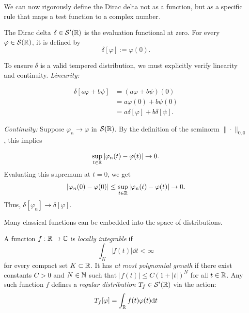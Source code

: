 We can now rigorously define the Dirac delta not as a function, but as a specific rule that maps a test function to a complex number.

\begin{definition}
The Dirac delta $\delta \in \mathcal{S}'(\mathbb{R})$ is the evaluation functional at zero. For every $\varphi \in \mathcal{S}(\mathbb{R})$, it is defined by
\begin{equation}
\delta[\varphi] := \varphi(0).
\end{equation}

\end{definition}

\begin{remark}
To ensure $\delta$ is a valid tempered distribution, we must explicitly verify linearity and continuity.
\textit{Linearity:}

\[
\begin{aligned}
\delta[a\varphi + b\psi] &= (a\varphi + b\psi)(0) \\
&= a\varphi(0) + b\psi(0) \\
&= a\delta[\varphi] + b\delta[\psi].
\end{aligned}
\]

\textit{Continuity:} Suppose $\varphi_n \to \varphi$ in $\mathcal{S}(\mathbb{R})$. By the definition of the seminorm $\|\cdot\|_{0,0}$, this implies

\[
\sup_{t \in \mathbb{R}} |\varphi_n(t) - \varphi(t)| \to 0.
\]
Evaluating this supremum at $t=0$, we get
\[
|\varphi_n(0) - \varphi(0)| \leq \sup_{t \in \mathbb{R}} |\varphi_n(t) - \varphi(t)| \to 0.
\]
Thus, $\delta[\varphi_n] \to \delta[\varphi]$.
\end{remark}

Many classical functions can be embedded into the space of distributions.

\begin{definition}
A function $f: \mathbb{R} \to \mathbb{C}$ is \textit{locally integrable} if \[
\int_K |f(t)| \dd t < \infty
\] for every compact set $K \subset \mathbb{R}$. It has \textit{at most polynomial growth} if there exist constants $C > 0$ and $N \in \mathbb{N}$ such that $|f(t)| \leq C(1 + |t|)^N$ for all $t \in \mathbb{R}$.
Any such function $f$ defines a \textit{regular distribution} $T_f \in \mathcal{S}'(\mathbb{R})$ via the action:
\begin{equation}
T_f[\varphi] = \int_{\mathbb{R}} f(t) \varphi(t) \mathrm{d} t
\end{equation}

\end{definition}

